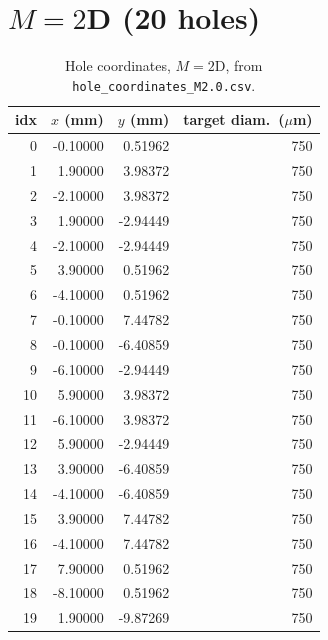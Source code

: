 \section{$M=2$D (20 holes)}
\begin{longtable}{rrrr}
\caption{Hole coordinates, $M=2$D, from \texttt{hole\_coordinates\_M2.0.csv}.}\\
\toprule
idx & $x$ (mm) & $y$ (mm) & target diam.\ ($\mu$m) \\
\midrule
\endhead
0 & -0.10000 & 0.51962 & 750 \\
1 & 1.90000 & 3.98372 & 750 \\
2 & -2.10000 & 3.98372 & 750 \\
3 & 1.90000 & -2.94449 & 750 \\
4 & -2.10000 & -2.94449 & 750 \\
5 & 3.90000 & 0.51962 & 750 \\
6 & -4.10000 & 0.51962 & 750 \\
7 & -0.10000 & 7.44782 & 750 \\
8 & -0.10000 & -6.40859 & 750 \\
9 & -6.10000 & -2.94449 & 750 \\
10 & 5.90000 & 3.98372 & 750 \\
11 & -6.10000 & 3.98372 & 750 \\
12 & 5.90000 & -2.94449 & 750 \\
13 & 3.90000 & -6.40859 & 750 \\
14 & -4.10000 & -6.40859 & 750 \\
15 & 3.90000 & 7.44782 & 750 \\
16 & -4.10000 & 7.44782 & 750 \\
17 & 7.90000 & 0.51962 & 750 \\
18 & -8.10000 & 0.51962 & 750 \\
19 & 1.90000 & -9.87269 & 750 \\
\bottomrule
\end{longtable}

